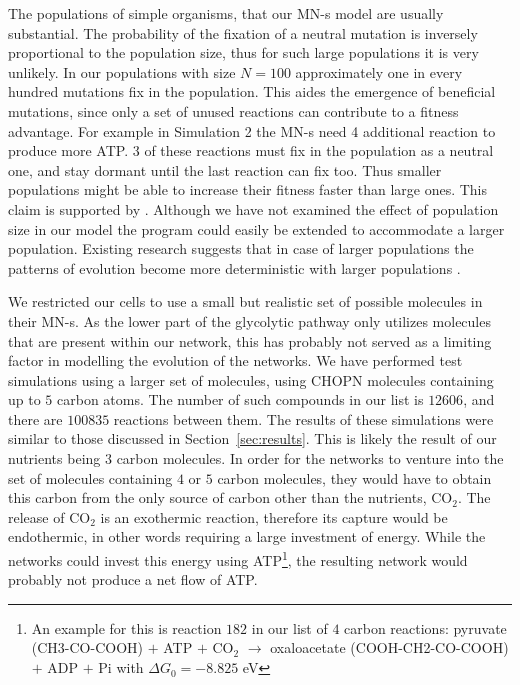 \documentclass[a4paper,12pt]{article}
\begin{document}
The populations of simple organisms, that our MN-s model are usually substantial. The probability of the fixation of a neutral mutation is inversely proportional to the population size, thus for such large populations it is very unlikely. In our populations with size $N=100$ approximately one in every hundred mutations fix in the population. This aides the emergence of beneficial mutations, since only a set of unused reactions can contribute to a fitness advantage. For example in Simulation 2 the MN-s need 4 additional reaction to produce more ATP. $3$ of these reactions must fix in the population as a neutral one, and stay dormant until the last reaction can fix too. Thus smaller populations might be able to increase their fitness faster than large ones. This claim is supported by \cite{smallpopulation}. 
Although we have not examined the effect of population size in our model the program could easily be extended to accommodate a larger population. Existing research suggests that in case of larger populations the patterns of evolution become more deterministic with larger populations \cite{predictability}.


We restricted our cells to use a small but realistic set of possible molecules in their MN-s. As the lower part of the glycolytic pathway only utilizes molecules that are present within our network, this has probably not served as a limiting factor in modelling the evolution of the networks. We have performed test simulations using a larger set of molecules, using CHOPN molecules containing up to $5$ carbon atoms. The number of such compounds in our list is $12606$, and there are $100 835$ reactions between them. The results of these simulations were similar to those discussed in Section~\ref{sec:results}. This is likely the result of our nutrients being $3$ carbon molecules. In order for the networks to venture into the set of molecules containing $4$ or $5$ carbon molecules, they would have to obtain this carbon from the only source of carbon other than the nutrients, CO$_2$. The release of CO$_2$ is an exothermic reaction, therefore its capture would be endothermic, in other words requiring a large investment of energy. While the networks could invest this energy using ATP\footnote{ An example for this is reaction $182$ in our list of $4$ carbon reactions: pyruvate (CH3-CO-COOH) $+$ ATP $+$ CO$_2$ $\rightarrow$  oxaloacetate (COOH-CH2-CO-COOH) $+$ ADP $+$ Pi with $\Delta G_0=-8.825$ eV}, the resulting network would probably not produce a net flow of ATP. 
\end{document}

